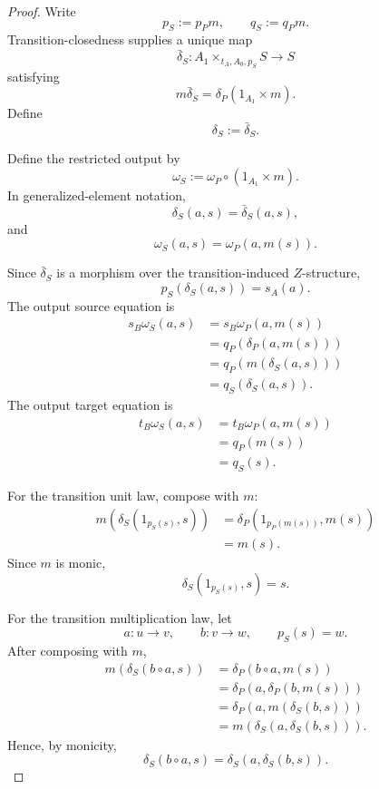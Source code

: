 \begin{proof}
    Write
    \[
        p_S:=p_Pm,
        \qquad
        q_S:=q_Pm.
    \]
    Transition-closedness supplies a unique map
    \[
        \bar\delta_S:
        A_1\times_{t_A,A_0,p_S}S
        \to
        S
    \]
    satisfying
    \[
        m\bar\delta_S
        =
        \delta_P(1_{A_1}\times m).
    \]
    Define
    \[
        \delta_S:=\bar\delta_S.
    \]

    Define the restricted output by
    \[
        \omega_S
        :=
        \omega_P\circ(1_{A_1}\times m).
    \]
    In generalized-element notation,
    \[
        \delta_S(a,s)=\bar\delta_S(a,s),
    \]
    and
    \[
        \omega_S(a,s)=\omega_P(a,m(s)).
    \]

    Since \(\bar\delta_S\) is a morphism over the transition-induced
    \(Z\)-structure,
    \[
        p_S(\delta_S(a,s))=s_A(a).
    \]
    The output source equation is
    \[
        \begin{aligned}
            s_B\omega_S(a,s)
            &=
            s_B\omega_P(a,m(s))
            \\
            &=
            q_P(\delta_P(a,m(s)))
            \\
            &=
            q_P(m(\delta_S(a,s)))
            \\
            &=
            q_S(\delta_S(a,s)).
        \end{aligned}
    \]
    The output target equation is
    \[
        \begin{aligned}
            t_B\omega_S(a,s)
            &=
            t_B\omega_P(a,m(s))
            \\
            &=
            q_P(m(s))
            \\
            &=
            q_S(s).
        \end{aligned}
    \]

    For the transition unit law, compose with \(m\):
    \[
        \begin{aligned}
            m(\delta_S(1_{p_S(s)},s))
            &=
            \delta_P(1_{p_P(m(s))},m(s))
            \\
            &=
            m(s).
        \end{aligned}
    \]
    Since \(m\) is monic,
    \[
        \delta_S(1_{p_S(s)},s)=s.
    \]

    For the transition multiplication law, let
    \[
        a:u\to v,
        \qquad
        b:v\to w,
        \qquad
        p_S(s)=w.
    \]
    After composing with \(m\),
    \[
        \begin{aligned}
            m(\delta_S(b\circ a,s))
            &=
            \delta_P(b\circ a,m(s))
            \\
            &=
            \delta_P(a,\delta_P(b,m(s)))
            \\
            &=
            \delta_P(a,m(\delta_S(b,s)))
            \\
            &=
            m(\delta_S(a,\delta_S(b,s))).
        \end{aligned}
    \]
    Hence, by monicity,
    \[
        \delta_S(b\circ a,s)
        =
        \delta_S(a,\delta_S(b,s)).
    \]


\end{proof}

